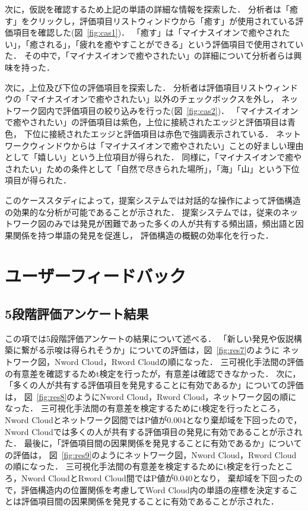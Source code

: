 \documentclass[syuuron]{kuee}
\begin{document}
	次に，仮説を確認するため上記の単語の詳細な情報を探索した．
	分析者は「癒す」をクリックし，評価項目リストウィンドウから「癒す」が使用されている評価項目を確認した(図~\ref{fig:cas1})．
	「癒す」は「マイナスイオンで癒やされたい」，「癒される」，「疲れを癒やすことができる」という評価項目で使用されていた．
	その中で，「マイナスイオンで癒やされたい」の詳細について分析者らは興味を持った．
	
	次に，上位及び下位の評価項目を探索した．
	分析者は評価項目リストウィンドウの「マイナスイオンで癒やされたい」以外のチェックボックスを外し，
	ネットワーク図内で評価項目の絞り込みを行った(図~\ref{fig:cas2})．
	「マイナスイオンで癒やされたい」の評価項目は紫色，上位に接続されたエッジと評価項目は青色，
	下位に接続されたエッジと評価項目は赤色で強調表示されている．
	ネットワークウィンドウからは「マイナスイオンで癒やされたい」ことの好ましい理由として「嬉しい」という上位項目が得られた．
	同様に，「マイナスイオンで癒やされたい」ための条件として「自然で尽きられた場所」，「海」「山」という下位項目が得られた．
	
	このケーススタディによって，提案システムでは対話的な操作によって評価構造の効果的な分析が可能であることが示された．
	提案システムでは，従来のネットワーク図のみでは発見が困難であった多くの人が共有する頻出語，頻出語と因果関係を持つ単語の発見を促進し，
	評価構造の概観の効率化を行った．
	
	\section{ユーザーフィードバック}
		\subsection{5段階評価アンケート結果}
		この項では5段階評価アンケートの結果について述べる．
		「新しい発見や仮説構築に繋がる示唆は得られそうか」についての評価は，図~\ref{fig:res7}のように
		ネットワーク図，Nword Cloud，Rword Cloudの順になった．
		三可視化手法間の評価の有意差を確認するためt検定を行ったが，有意差は確認できなかった．
		次に，「多くの人が共有する評価項目を発見することに有効であるか」についての評価は，
		図~\ref{fig:res8}のようにNword Cloud，Rword Cloud，ネットワーク図の順になった．
		三可視化手法間の有意差を検定するためにt検定を行ったところ，Nword Cloudとネットワーク図間ではP値が0.004となり棄却域を下回ったので，
		Nword Cloudでは多くの人が共有する評価項目の発見に有効であることが示された．
		最後に，「評価項目間の因果関係を発見することに有効であるか」についての評価は，
		図~\ref{fig:res9}のようにネットワーク図，Nword Cloud，Rword Cloudの順になった．
		三可視化手法間の有意差を検定するためにt検定を行ったところ，Nword CloudとRword Cloud間ではP値が0.040となり，
		棄却域を下回ったので，評価構造内の位置関係を考慮してWord Cloud内の単語の座標を決定することは評価項目間の因果関係を発見することに有効であることが示された．
	
\end{document}
